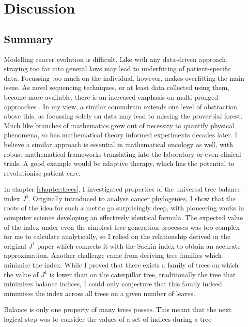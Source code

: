 \chapter{Discussion}\label{chapter:discussion}

\section{Summary}
Modelling cancer evolution is difficult. Like with any data-driven approach,
straying too far into general laws may lead to underfitting of
patient-specific data. Focussing too much on the individual, however, makes
overfitting the main issue. As novel sequencing techniques, or at least data
collected using them, become more available, there is an increased emphasis on
multi-pronged approaches \cite{heide_assessment_2021, others}. In my view, a
similar conundrum extends one level of abstraction above this, as focussing
solely on data may lead to missing the proverbial forest. Much like branches of
mathematics grew out of necessity to quantify physical phenomena, so has
mathematical theory informed experiments decades later. I believe a similar
approach is essential in mathematical oncology as well, with robust mathematical
frameworks translating into the laboratory or even clinical trials. A good
example would be adaptive therapy, which has the potential to revolutionise
patient care.\par
In chapter \ref{chapter:trees}, I investigated properties of the universal tree
balance index $J^1$. Originally introduced to analyse cancer phylogenies, I show
that the roots of the idea for such a metric go surprisingly deep, with
pioneering works in computer science developing an effectively identical
formula. The expected value of the index under even the simplest tree generation
processes was too complex for me to calculate analytically, so I relied on the
relationship derived in the original $J^1$ paper \cite{lemant_robust_2022} which
connects it with the Sackin index to obtain an accurate approximation. Another
challenge came from deriving tree families which minimise the index. While I
proved that there exists a family of trees on which the value of $J^1$ is lower
than on the caterpillar tree, traditionally the tree that minimises balance
indices, I could only conjecture that this family indeed minimises the index
across all trees on a given number of leaves. \par
Balance is only one property of many trees posses. This meant that the next
logical step was to consider the values of a set of indices during a tree
